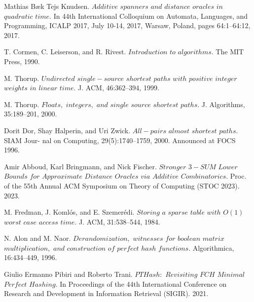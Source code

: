 \documentclass[shortabstract, lic, english]{iithesis}
\theoremstyle{definition} \newtheorem{definition}{Definition}[chapter]
\theoremstyle{plain} \newtheorem{remark}[definition]{Observation}
\theoremstyle{plain} \newtheorem{theorem}[definition]{Theorem}
\theoremstyle{plain} \newtheorem{lemma}[definition]{Lemma}
\theoremstyle{plain} \newtheorem{conjecture}[definition]{Conjecture}
\begin{document}
\begin{thebibliography}{1}
Mathias Bæk Tejs Knudsen. $Additive$ $spanners$ $and$ $distance$ $oracles$ $in$ $quadratic$ $time.$
In 44th International Colloquium on Automata, Languages, and Programming, ICALP
2017, July 10-14, 2017, Warsaw, Poland, pages 64:1–64:12, 2017.


T. Cormen, C. Leiserson, and R. Rivest. $Introduction$ $to$ $algorithms.$
The MIT Press, 1990.

M. Thorup. $Undirected$ $single-source$ $shortest$ $paths$ $with$ $positive$
$integer$ $weights$ $in$ $linear$ $time.$ J. ACM, 46:362–394, 1999.

M. Thorup. $Floats,$ $integers,$ $and$ $single$ $source$ $shortest$ $paths.$ J.
Algorithms, 35:189–201, 2000.

Dorit Dor, Shay Halperin, and Uri Zwick. $All-pairs$ $almost$ $shortest$ $paths.$ SIAM Jour-
nal on Computing, 29(5):1740–1759, 2000. Announced at FOCS 1996.

Amir Abboud, Karl Bringmann, and Nick Fischer. $Stronger$ $3-SUM$ $Lower$ $Bounds$ $for$
$Approximate$ $Distance$ $Oracles$ $via$ $Additive$ $Combinatorics.$ Proc. of the 55th Annual ACM
Symposium on Theory of Computing (STOC 2023). 2023.

M. Fredman, J. Koml\'os, and E. Szemer\'edi. $Storing$ $a$ $sparse$ $table$
$with$ $O(1)$ $worst$ $case$ $access$ $time.$ J. ACM, 31:538–544, 1984.

N. Alon and M. Naor. $Derandomization,$ $witnesses$ $for$ $boolean$
$matrix$ $multiplication,$ $and$ $construction$ $of$ $perfect$ $hash$ $functions.$
Algorithmica, 16:434–449, 1996.

Giulio Ermanno Pibiri and Roberto Trani. $PTHash:$ $Revisiting$ $FCH$ $Minimal$ $Perfect$ $Hashing.$
In Proceedings of the 44th International Conference on Research and Development in Information Retrieval (SIGIR). 2021.

\end{thebibliography}
\end{document}
